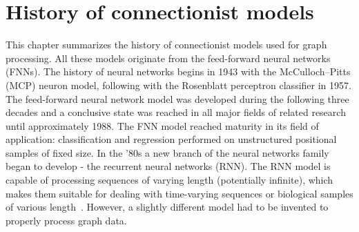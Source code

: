 
\chapter{History of connectionist models\label{chap:history}}
This chapter summarizes the history of connectionist models used for graph processing. All these models originate from the feed-forward neural networks (FNNs). The history of neural networks begins in 1943 with the McCulloch–Pitts (MCP) neuron model, following with the Rosenblatt perceptron classifier in 1957. The feed-forward neural network model was developed during the following three decades and a conclusive state was reached in all major fields of related research until approximately 1988. The FNN model reached maturity in its field of application: classification and regression performed on unstructured positional samples of fixed size. In the '80s a new branch of the neural networks family began to develop - the recurrent neural networks (RNN). The RNN model is capable of processing sequences of varying length (potentially infinite), which makes them suitable for dealing with time-varying sequences or biological samples of various length~\cite{saha2006prediction}. However, a slightly different model had to be invented to properly process graph data.

